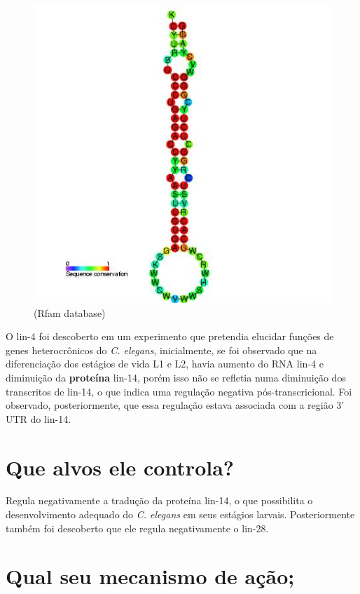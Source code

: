 \documentclass[
]{book}
\begin{document}
\begin{figure}
\centering
\includegraphics{./pics/lin4.jpg}
\caption{(Rfam database)}
\end{figure}

O lin-4 foi descoberto em um experimento que pretendia elucidar funções de genes heterocrônicos do \emph{C. elegans}, inicialmente, se foi observado que na diferenciação dos estágios de vida L1 e L2, havia aumento do RNA lin-4 e diminuição da \textbf{proteína} lin-14, porém isso não se refletia numa diminuição dos transcritos de lin-14, o que indica uma regulação negativa pós-transcricional. Foi observado, posteriormente, que essa regulação estava associada com a região 3' UTR do lin-14.

\hypertarget{que-alvos-ele-controla}{%
\section{Que alvos ele controla?}\label{que-alvos-ele-controla}}

Regula negativamente a tradução da proteína lin-14, o que possibilita o desenvolvimento adequado do \emph{C. elegans} em seus estágios larvais. Posteriormente também foi descoberto que ele regula negativamente o lin-28.

\hypertarget{qual-seu-mecanismo-de-auxe7uxe3o}{%
\section{Qual seu mecanismo de ação;}\label{qual-seu-mecanismo-de-auxe7uxe3o}}
\end{document}
